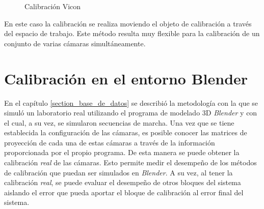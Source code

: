 \begin{figure}[ht!]
        \centering        
        \hspace{1.8cm}
  \caption{Calibración Vicon}
      \label{vicon}
\end{figure}

En este caso la calibración se realiza moviendo el objeto de calibración a través del espacio de trabajo. Este método resulta muy flexible para la calibración de un conjunto de varias cámaras simultáneamente.


\section{Calibración en el entorno Blender}

En el capítulo \ref{section_base_de_datos} se describió la metodología con la que se simuló un laboratorio real utilizando el programa de modelado 3D \emph{Blender} y con el cual, a su vez, se simularon secuencias de marcha. Una vez que se tiene establecida la configuración de las cámaras, es posible conocer las matrices de proyección de cada una de estas cámaras a través de la información proporcionada por el propio programa. De esta manera se puede obtener la calibración \textit{real} de las cámaras. Esto permite  medir el desempeño de los métodos de calibración que puedan ser simulados en \emph{Blender}. A su vez, al tener la calibración \textit{real}, se puede evaluar el desempeño de otros bloques del sistema aislando el error que pueda aportar el bloque de calibración al error final del sistema.\\


